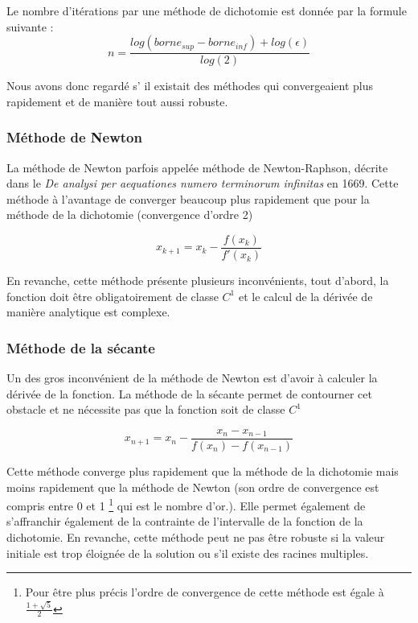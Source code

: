 Le nombre d'itérations par une méthode de dichotomie est donnée par la formule suivante : 
\begin{equation}
n = \frac{log(borne_{sup} - borne_{inf}) + log(\epsilon)}{log(2)} 
\end{equation}

Nous avons donc regardé s' il existait des méthodes qui convergeaient plus rapidement et de manière tout aussi robuste. 

\subsubsection{Méthode de Newton}
La méthode de Newton parfois appelée méthode de Newton-Raphson, décrite dans le \textit{De analysi per aequationes numero terminorum infinitas} en 1669. Cette méthode à l'avantage de converger beaucoup plus rapidement que pour la méthode de la dichotomie (convergence d'ordre 2)

\begin{equation}
x_{k+1} = x_k - \frac{f(x_k)}{f'(x_k)}
\end{equation}

En revanche, cette méthode présente plusieurs inconvénients, tout d'abord, la fonction doit être obligatoirement de classe $C^1$ et le calcul de la dérivée de manière analytique est complexe.


\subsubsection{Méthode de la sécante}

Un des gros inconvénient de la méthode de Newton est d'avoir à calculer la dérivée de la fonction. La méthode de la sécante permet de contourner cet obstacle et ne nécessite pas que la fonction soit de classe $C^1$

\begin{equation}
x_{n+1} = x_n - \frac{x_n - x_{n-1}}{f(x_n) - f(x_{n-1})}
\end{equation}

Cette méthode converge plus rapidement que la méthode de la dichotomie mais moins rapidement que la méthode de Newton (son ordre de convergence est compris entre 0 et 1 \footnote{Pour être plus précis l'ordre de convergence de cette méthode est égale à $\frac{1 + \sqrt{5}}{2}$} qui est le nombre d'or.). Elle permet également de s'affranchir également de la contrainte de l'intervalle de la fonction de la dichotomie. En revanche, cette méthode peut ne pas être robuste si la valeur initiale est trop éloignée de la solution ou s'il existe des racines multiples.

